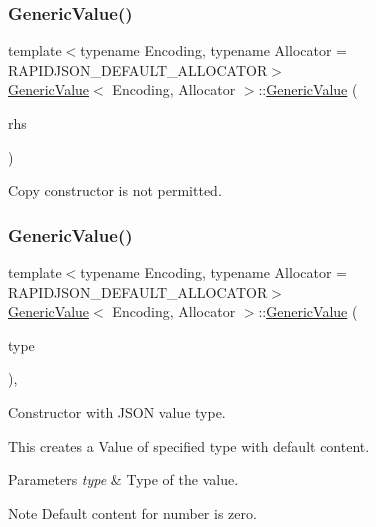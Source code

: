 \subsubsection{\texorpdfstring{Generic\+Value()}{GenericValue()}\hspace{0.1cm}{\footnotesize\ttfamily [2/17]}}
{\footnotesize\ttfamily template$<$typename Encoding, typename Allocator = R\+A\+P\+I\+D\+J\+S\+O\+N\+\_\+\+D\+E\+F\+A\+U\+L\+T\+\_\+\+A\+L\+L\+O\+C\+A\+T\+OR$>$ \\
\hyperlink{classGenericValue}{Generic\+Value}$<$ Encoding, Allocator $>$\+::\hyperlink{classGenericValue}{Generic\+Value} (\begin{DoxyParamCaption}\item[{const \hyperlink{classGenericValue}{Generic\+Value}$<$ Encoding, Allocator $>$ \&}]{rhs }\end{DoxyParamCaption})\hspace{0.3cm}{\ttfamily [private]}}



Copy constructor is not permitted. 

\mbox{\label{classGenericValue_a83c8f84b8e61f2f40414b703b75aea61}} 
\subsubsection{\texorpdfstring{Generic\+Value()}{GenericValue()}\hspace{0.1cm}{\footnotesize\ttfamily [3/17]}}
{\footnotesize\ttfamily template$<$typename Encoding, typename Allocator = R\+A\+P\+I\+D\+J\+S\+O\+N\+\_\+\+D\+E\+F\+A\+U\+L\+T\+\_\+\+A\+L\+L\+O\+C\+A\+T\+OR$>$ \\
\hyperlink{classGenericValue}{Generic\+Value}$<$ Encoding, Allocator $>$\+::\hyperlink{classGenericValue}{Generic\+Value} (\begin{DoxyParamCaption}\item[{\hyperlink{rapidjson_8h_a1d1cfd8ffb84e947f82999c682b666a7}{Type}}]{type }\end{DoxyParamCaption})\hspace{0.3cm}{\ttfamily [inline]}, {\ttfamily [explicit]}}



Constructor with J\+S\+ON value type. 

This creates a Value of specified type with default content. 
\begin{DoxyParams}{Parameters}
{\em type} & Type of the value. \\
\hline
\end{DoxyParams}
\begin{DoxyNote}{Note}
Default content for number is zero. 
\end{DoxyNote}
\mbox{\label{classGenericValue_a76c68b72723a06045776dbd425f9e8b6}} 
